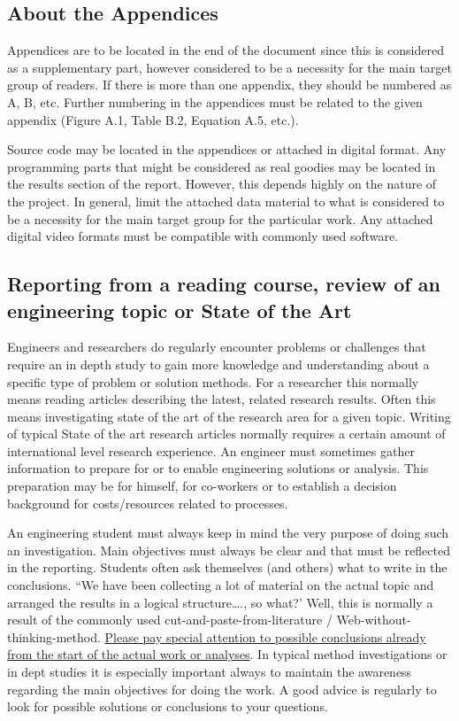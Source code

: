 \documentclass[a4paper,11pt]{extarticle}
\begin{document}
\subsection{About the Appendices}
Appendices are to be located in the end of the document since this is considered as a supplementary part, however considered to be a necessity for the main target group of readers. If there is more than one appendix, they should be numbered as A, B, etc. Further numbering in the appendices must be related to the given appendix (Figure A.1, Table B.2, Equation A.5, etc.). 

Source code may be located in the appendices or attached in digital format. Any programming parts that might be considered as real goodies may be located in the results section of the report. However, this depends highly on the nature of the project. In general, limit the attached data material to what is considered to be a necessity for the main target group for the particular work. Any attached digital video formats must be compatible with commonly used software.

\subsection{Reporting from a reading course, review of an engineering topic or State of the Art}
Engineers and researchers do regularly encounter problems or challenges that require an in depth study to gain more knowledge and understanding about a specific type of problem or solution methods. For a researcher this normally means reading articles describing the latest, related research results. Often this means investigating state of the art of the research area for a given topic. Writing of typical State of the art research articles normally requires a certain amount of international level research experience. An engineer must sometimes gather information to prepare for or to enable engineering solutions or analysis. This preparation may be for himself, for co-workers or to establish a decision background for costs/resources related to processes. 

An engineering student must always keep in mind the very purpose of doing such an investigation. Main objectives must always be clear and that must be reflected in the reporting. Students often ask themselves (and others) what to write in the conclusions. “We have been collecting a lot of material on the actual topic and arranged the results in a logical structure…., so what?’ Well, this is normally a result of the commonly used cut-and-paste-from-literature / Web-without-thinking-method. \ul{Please pay special attention to possible conclusions already from the start of the actual work or analyses}. In typical method investigations or in dept studies it is especially important always to maintain the awareness regarding the main objectives for doing the work. A good advice is regularly to look for possible solutions or conclusions to your questions.
\end{document}
